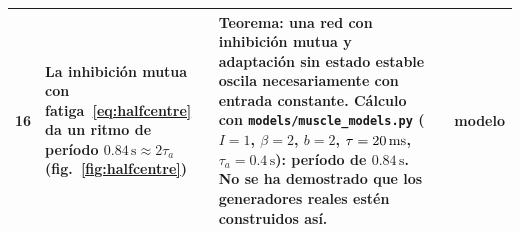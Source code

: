 {\begin{longtable}{>{\raggedright}p{0.5cm}>{\raggedright}p{4.0cm}>{\raggedright}p{5.6cm}>{\raggedright}p{2.3cm}>{\raggedright\arraybackslash}p{1.7cm}}
16 & La inhibición mutua con fatiga~\eqref{eq:halfcentre} da un ritmo de período $0.84\,\text{s}\approx2\tau_a$ (fig.~\ref{fig:halfcentre}) & Teorema: una red con inhibición mutua y adaptación sin estado estable oscila necesariamente con entrada constante. Cálculo con \texttt{models/\allowbreak muscle\_\allowbreak models.py} ($I=1$, $\beta=2$, $b=2$, $\tau=20\,\text{ms}$, $\tau_a=0.4\,\text{s}$): período de $0.84\,\text{s}$. No se ha demostrado que los generadores reales estén construidos así. & \cite{Matsuoka1985osc} & modelo \\
\bottomrule
\end{longtable}}

